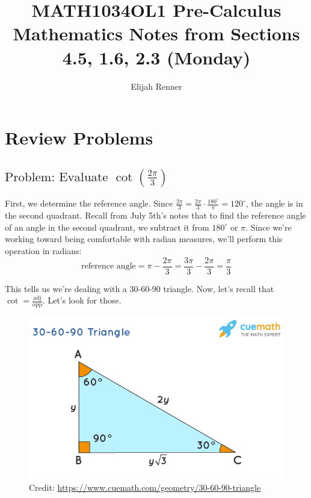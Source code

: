 \documentclass[12pt]{article}
\title{MATH1034OL1 Pre-Calculus Mathematics Notes from Sections 4.5, 1.6, 2.3 (Monday)}
\author{Elijah Renner}
\begin{document}
\maketitle

\vspace{0.5in}

\tableofcontents


\section{Review Problems}


\subsection{\(\text{Problem: Evaluate }
\cot \left( \frac{2\pi}{3} \right)\)}

First, we determine the reference angle. Since \(\frac{2\pi}{3}=\frac{2\pi}{3}\cdot\frac{180^{\circ}}{\pi}=120^{\circ}\), the angle is in the second quadrant. Recall from July 5th's notes that to find the reference angle of an angle in the second quadrant, we subtract it from \(180^{\circ}\) or \(\pi\). Since we're working toward being comfortable with radian measures, we'll perform this operation in radians:\\

\[\text{reference angle}=\pi-\frac{2\pi}{3}=\frac{3\pi}{3}-\frac{2\pi}{3}=\frac{\pi}{3}\]

This tells us we're dealing with a 30-60-90 triangle. Now, let's recall that \(\cot=\frac{\text{adj}}{\text{opp}}\). Let's look for those.

\begin{figure}[H]
	\centering
	\includegraphics[scale=0.5]{30-60-90-triangle-1621153010.png}
	\caption{Credit: \url{https://www.cuemath.com/geometry/30-60-90-triangle}}
\end{figure}
\end{document}

